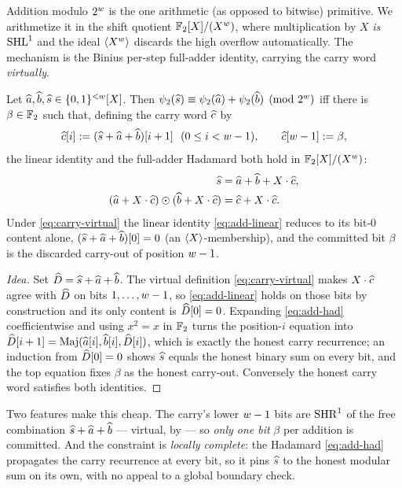 Addition modulo $2^{w}$ is the one arithmetic (as opposed to bitwise)
primitive. We arithmetize it in the shift quotient $\mathbb{F}_2[X]/(X^{w})$, where
multiplication by $X$ \emph{is} $\operatorname{SHL}^{1}$ and the ideal $\langle X^{w} \rangle$
discards the high overflow automatically. The mechanism is the Binius
per-step full-adder identity, carrying the carry word \emph{virtually}.

\begin{lemma}
\label{lem:binius}
Let $\widehat{a},\widehat{b},\widehat{s}\in\{0,1\}^{<w}[X]$. Then $\psi_2(\widehat{s})\equiv
\psi_2(\widehat{a})+\psi_2(\widehat{b})\pmod{2^{w}}$ iff there is $\beta\in\mathbb{F}_2$
such that, defining the carry word $\widehat{c}$ by
\begin{equation}
  \label{eq:carry-virtual}
  \widehat{c}[i] := (\widehat{s}+\widehat{a}+\widehat{b})[i+1] \ \ (0\le i<w-1),
  \qquad \widehat{c}[w-1] := \beta,
\end{equation}
the linear identity and the full-adder Hadamard both hold in $\mathbb{F}_2[X]/(X^{w})$:
\begin{align}
  \widehat{s} &= \widehat{a}+\widehat{b}+X\cdot\widehat{c}, \label{eq:add-linear}\\
  (\widehat{a}+X\cdot\widehat{c})\odot(\widehat{b}+X\cdot\widehat{c}) &= \widehat{c}+X\cdot\widehat{c}. \label{eq:add-had}
\end{align}
Under \eqref{eq:carry-virtual} the linear identity \eqref{eq:add-linear}
reduces to its bit-$0$ content alone,
$(\widehat{s}+\widehat{a}+\widehat{b})[0]=0$ (an $\langle X \rangle$-membership), and the
committed bit $\beta$ is the discarded carry-out of position $w-1$.
\end{lemma}

\begin{proof}[Idea]
Set $\widehat{D}=\widehat{s}+\widehat{a}+\widehat{b}$. The virtual definition
\eqref{eq:carry-virtual} makes $X\cdot\widehat{c}$ agree with $\widehat{D}$ on bits
$1,\dots,w-1$, so \eqref{eq:add-linear} holds on those bits by
construction and its only content is $\widehat{D}[0]=0$. Expanding
\eqref{eq:add-had} coefficientwise and using $x^2=x$ in $\mathbb{F}_2$ turns the
position-$i$ equation into $\widehat{D}[i+1]=\operatorname{Maj}(\widehat{a}[i],\widehat{b}[i],\widehat{D}[i])$,
which is exactly the honest carry recurrence; an induction from
$\widehat{D}[0]=0$ shows $\widehat{s}$ equals the honest binary sum on every bit,
and the top equation fixes $\beta$ as the honest carry-out. Conversely
the honest carry word satisfies both identities.
\end{proof}

Two features make this cheap. The carry's lower $w-1$ bits are
$\operatorname{SHR}^{1}$ of the free combination $\widehat{s}+\widehat{a}+\widehat{b}$ --- virtual, by
 --- so \emph{only one bit} $\beta$ per addition is
committed. And the constraint is \emph{locally complete}: the Hadamard
\eqref{eq:add-had} propagates the carry recurrence at every bit, so it
pins $\widehat{s}$ to the honest modular sum on its own, with no appeal to a
global boundary check.

